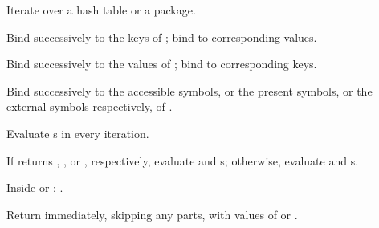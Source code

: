 \begin{LIST}{1cm}
\begin{LIST}{.5cm}
\begin{LIST}{.5cm}
      {
        Iterate over a hash table or a package.
      }

      \begin{LIST}{.5cm}

        {
          Bind  successively to the keys of ;
          bind  to corresponding values.
        }

        {
          Bind  successively to the values of
          ; bind  to corresponding keys.
        }

        {
          Bind  successively to the accessible symbols, or
          the present symbols, or the external symbols respectively,
          of . 
        }

      \end{LIST}
    \end{LIST}
    
    {
      Evaluate s in every iteration.
    }

    {
      If  returns \T, \T, or \NIL, respectively, evaluate
       and s; otherwise, evaluate
       and s.
    }

    \begin{LIST}{.5cm}
      {
        Inside  or :
        .
      }
    \end{LIST}

    {
      Return immediately, skipping any  parts, with
      values of  or .
    }


\end{LIST}
\end{LIST}
